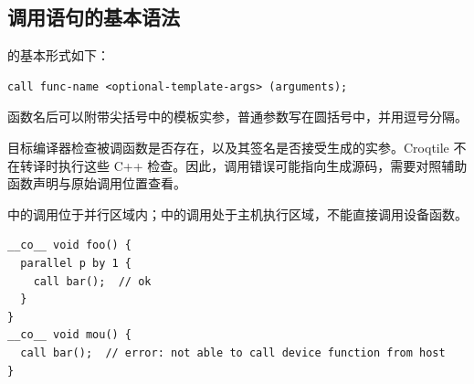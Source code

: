 \subsection*{调用语句的基本语法}

\co@call@ 的基本形式如下：

\begin{lstlisting}[language=croqtile,caption={调用语句的一般语法}]
call func-name <optional-template-args> (arguments);
\end{lstlisting}

函数名后可以附带尖括号中的模板实参，普通参数写在圆括号中，并用逗号分隔。

目标编译器检查被调函数是否存在，以及其签名是否接受生成的实参。Croqtile 不在转译时执行这些 C++ 检查。因此，调用错误可能指向生成源码，需要对照辅助函数声明与原始调用位置查看。

\co@foo@ 中的调用位于并行区域内；\co@mou@ 中的调用处于主机执行区域，不能直接调用设备函数。

\begin{lstlisting}[language=croqtile,caption={非法的调用点}]
__co__ void foo() {
  parallel p by 1 {
    call bar();  // ok
  }
}
__co__ void mou() {
  call bar();  // error: not able to call device function from host
}
\end{lstlisting}
